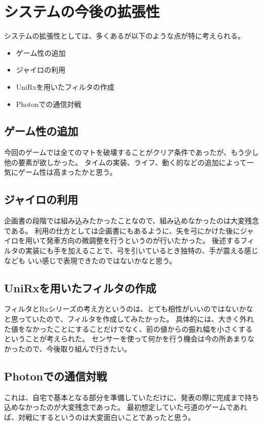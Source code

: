 \documentclass[11pt,a4j]{jsarticle}
\begin{document}
\section{システムの今後の拡張性}
システムの拡張性としては、多くあるが以下のような点が特に考えられる。

\begin{itemize}
  \item ゲーム性の追加
  \item ジャイロの利用
  \item UniRxを用いたフィルタの作成
  \item Photonでの通信対戦
\end{itemize}

\subsection{ゲーム性の追加}
今回のゲームでは全てのマトを破壊することがクリア条件であったが、もう少し他の要素が欲しかった。
タイムの実装、ライフ、動く的などの追加によって一気にゲーム性は高まったかと思う。

\subsection{ジャイロの利用}
企画書の段階では組み込みたかったことなので、組み込めなかったのは大変残念である。
利用の仕方としては企画書にもあるように、矢を弓にかけた後にジャイロを用いて発車方向の微調整を行うというのが行いたかった。
後述するフィルタの実装にも手を加えることで、弓を引いているとき独特の、手が震える感じなども
いい感じで表現できたのではないかなと思う。


\subsection{UniRxを用いたフィルタの作成}
フィルタとRxシリーズの考え方というのは、とても相性がいいのではないかなと思っていたので、フィルタを作成してみたかった。
具体的には、大きく外れた値をなかったことにすることだけでなく、前の値からの振れ幅を小さくするということが考えられた。
センサーを使って何かを行う機会は今の所あまりなかったので、今後取り組んで行きたい。

\subsection{Photonでの通信対戦}
これは、自宅で基本となる部分を準備していただけに、発表の際に完成まで持ち込めなかったのが大変残念であった。
最初想定していた弓道のゲームであれば、対戦にするというのは大変面白いことであったと思う。
\end{document}
